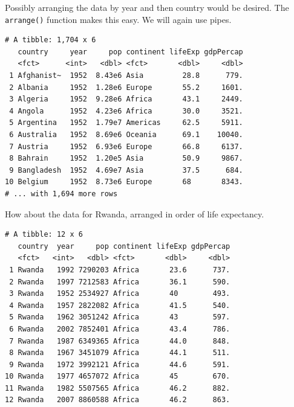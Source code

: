 \documentclass[]{krantz}
\makeatletter
\newenvironment{Shaded}{\begin{snugshade}}{\end{snugshade}}
\newcommand{\KeywordTok}[1]{\textcolor[rgb]{0.27,0.27,0.27}{\textbf{#1}}}
\newcommand{\NormalTok}[1]{#1}
\newcommand{\OperatorTok}[1]{\textcolor[rgb]{0.43,0.43,0.43}{\textbf{#1}}}
\newcommand{\StringTok}[1]{\textcolor[rgb]{0.5,0.5,0.5}{#1}}
\newenvironment{kframe}{%
\medskip{}
\setlength{\fboxsep}{.8em}
 \def\at@end@of@kframe{}%
 \ifinner\ifhmode%
  \def\at@end@of@kframe{\end{minipage}}%
  \begin{minipage}{\columnwidth}%
 \fi\fi%
 \def\FrameCommand##1{\hskip\@totalleftmargin \hskip-\fboxsep
 \colorbox{shadecolor}{##1}\hskip-\fboxsep
     \hskip-\linewidth \hskip-\@totalleftmargin \hskip\columnwidth}%
 \MakeFramed {\advance\hsize-\width
   \@totalleftmargin\z@ \linewidth\hsize
   \@setminipage}}%
 {\par\unskip\endMakeFramed%
 \at@end@of@kframe}
\renewenvironment{Shaded}{\begin{kframe}}{\end{kframe}}
\makeatother
\begin{document}
Possibly arranging the data by year and then country would be desired. The \texttt{arrange()} function makes this easy. We will again use pipes.

\begin{Shaded}
\end{Shaded}

\begin{verbatim}
# A tibble: 1,704 x 6
   country     year     pop continent lifeExp gdpPercap
   <fct>      <int>   <dbl> <fct>       <dbl>     <dbl>
 1 Afghanist~  1952  8.43e6 Asia         28.8      779.
 2 Albania     1952  1.28e6 Europe       55.2     1601.
 3 Algeria     1952  9.28e6 Africa       43.1     2449.
 4 Angola      1952  4.23e6 Africa       30.0     3521.
 5 Argentina   1952  1.79e7 Americas     62.5     5911.
 6 Australia   1952  8.69e6 Oceania      69.1    10040.
 7 Austria     1952  6.93e6 Europe       66.8     6137.
 8 Bahrain     1952  1.20e5 Asia         50.9     9867.
 9 Bangladesh  1952  4.69e7 Asia         37.5      684.
10 Belgium     1952  8.73e6 Europe       68       8343.
# ... with 1,694 more rows
\end{verbatim}

How about the data for Rwanda, arranged in order of life expectancy.

\begin{Shaded}
\end{Shaded}

\begin{verbatim}
# A tibble: 12 x 6
   country  year     pop continent lifeExp gdpPercap
   <fct>   <int>   <dbl> <fct>       <dbl>     <dbl>
 1 Rwanda   1992 7290203 Africa       23.6      737.
 2 Rwanda   1997 7212583 Africa       36.1      590.
 3 Rwanda   1952 2534927 Africa       40        493.
 4 Rwanda   1957 2822082 Africa       41.5      540.
 5 Rwanda   1962 3051242 Africa       43        597.
 6 Rwanda   2002 7852401 Africa       43.4      786.
 7 Rwanda   1987 6349365 Africa       44.0      848.
 8 Rwanda   1967 3451079 Africa       44.1      511.
 9 Rwanda   1972 3992121 Africa       44.6      591.
10 Rwanda   1977 4657072 Africa       45        670.
11 Rwanda   1982 5507565 Africa       46.2      882.
12 Rwanda   2007 8860588 Africa       46.2      863.
\end{verbatim}
\end{document}
